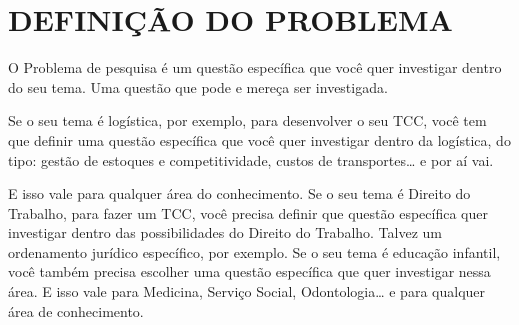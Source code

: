 % 
%


\chapter{DEFINIÇÃO DO PROBLEMA}
\label{chap:definicaoproblema}

O Problema de pesquisa é um questão específica que você quer investigar dentro do seu tema. Uma questão que pode e mereça ser investigada.

Se o seu tema é logística, por exemplo, para desenvolver o seu TCC, você tem que definir uma questão específica que você quer investigar dentro da logística, do tipo: gestão de estoques e competitividade, custos de transportes… e por aí vai.

E isso vale para qualquer área do conhecimento. Se o seu tema é Direito do Trabalho, para fazer um TCC, você precisa definir que questão específica quer investigar dentro das possibilidades do Direito do Trabalho. Talvez um ordenamento jurídico específico, por exemplo. Se o seu tema é educação infantil, você também precisa escolher uma questão específica que quer investigar nessa área. E isso vale para Medicina, Serviço Social, Odontologia… e para qualquer área de conhecimento.

